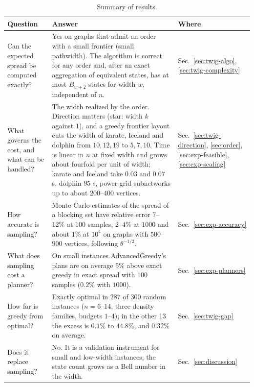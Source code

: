 \documentclass[11pt]{article}
\theoremstyle{definition}
\theoremstyle{remark}
\newcommand{\up}{\rule{0pt}{2.6ex}}
\begin{document}
\begin{table}[h]
\centering
\caption{Summary of results.}\label{tab:summary}
\small
\begin{tabular}{@{}p{}p{}p{}@{}}
\hline
\up Question & Answer & Where \\
\hline
\up Can the expected spread be computed exactly? & Yes on graphs that admit an order with a small frontier (small pathwidth). The algorithm is correct for any order and, after an exact aggregation of equivalent states, has at most $B_{w+2}$ states for width $w$, independent of $n$. & Sec.~\ref{sec:twig-algo}, \ref{sec:twig-complexity} \\
What governs the cost, and what can be handled? & The width realized by the order. Direction matters (star: width $k$ against $1$), and a greedy frontier layout cuts the width of karate, Iceland and dolphin from $10,12,19$ to $5,7,10$. Time is linear in $n$ at fixed width and grows about fourfold per unit of width; karate and Iceland take $0.03$ and $0.07$ s, dolphin $95$ s, power-grid subnetworks up to about $200$--$400$ vertices. & Sec.~\ref{sec:twig-direction}, \ref{sec:order}, \ref{sec:exp-feasible}, \ref{sec:exp-scaling} \\
How accurate is sampling? & Monte Carlo estimates of the spread of a blocking set have relative error $7$--$12\%$ at $100$ samples, $2$--$4\%$ at $1000$ and about $1\%$ at $10^4$ on graphs with $500$--$900$ vertices, following $\theta^{-1/2}$. & Sec.~\ref{sec:exp-accuracy} \\
What does sampling cost a planner? & On small instances AdvancedGreedy's plans are on average $5\%$ above exact greedy in exact spread with $100$ samples ($0.2\%$ with $1000$). & Sec.~\ref{sec:exp-planners} \\
How far is greedy from optimal? & Exactly optimal in 287 of 300 random instances ($n=6$--$14$, three density families, budgets $1$--$4$); in the other 13 the excess is $0.1\%$ to $44.8\%$, and $0.32\%$ on average. & Sec.~\ref{sec:twig-gap} \\
Does it replace sampling? & No. It is a validation instrument for small and low-width instances; the state count grows as a Bell number in the width. & Sec.~\ref{sec:discussion} \\
\hline
\end{tabular}
\end{table}
\end{document}
